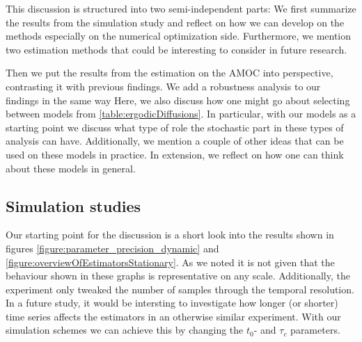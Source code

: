 This discussion is structured into two semi-independent parts: We first summarize the results from the simulation study and reflect on how we can develop on the methods especially on the numerical optimization side. Furthermore, we mention two estimation methods that could be interesting to consider in future research.

Then we put the results from the estimation on the AMOC into perspective, contrasting it with previous findings. We add a robustness analysis to our findings in the same way  Here, we also discuss how one might go about selecting between models from \ref{table:ergodicDiffusions}. In particular, with our models as a starting point we discuss what type of role the stochastic part in these types of analysis can have. Additionally, we mention a couple of other ideas that can be used on these models in practice. In extension, we reflect on how one can think about these models in general.
\subsection{Simulation studies}
Our starting point for the discussion is a short look into the results shown in figures \ref{figure:parameter_precision_dynamic} and \ref{figure:overviewOfEstimatorsStationary}. As we noted it is not given that the behaviour shown in these graphs is representative on any scale. Additionally, the experiment only tweaked the number of samples through the temporal resolution. In a future study, it would be intersting to investigate how longer (or shorter) time series affects the estimators in an otherwise similar experiment. With our simulation schemes we can achieve this by changing the $t_0$- and $\tau_c$ parameters.

